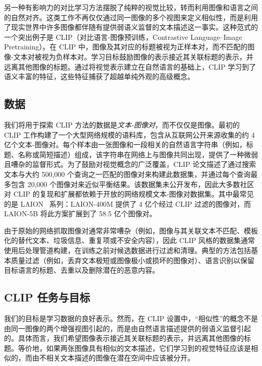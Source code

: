 \documentclass[../../book-main_zh.tex]{subfiles}
\begin{document}
另一种有影响力的对比学习方法摆脱了纯粹的视觉比较，转而利用图像和语言之间的自然对齐。这类工作不再仅仅通过同一图像的多个视图来定义相似性，而是利用了现实世界中许多图像都伴随有提供弱语义监督的文本描述这一事实。这种范式的一个突出例子是 CLIP（对比语言-图像预训练，Contrastive Language–Image Pretraining）\citep{Radford2021-ir}。在 CLIP 中，图像及其对应的标题被视为正样本对，而不匹配的图像-文本对被视为负样本对。学习目标鼓励图像的表示接近其关联标题的表示，并远离其他图像的标题。通过将视觉表示建立在自然语言的基础上，CLIP 学习到了语义丰富的特征，这些特征捕获了超越单纯外观的高级概念。

\subsection{数据}

我们将用于探索 CLIP 方法的数据是{\em 文本-图像对}，而不仅仅是图像。最初的 CLIP 工作构建了一个大型网络规模的语料库，包含从互联网公开来源收集的约 4 亿个文本-图像对。每个样本由一张图像和一段相关的自然语言字符串（例如，标题、名称或简短描述）组成，该字符串在网络上与图像共同出现，提供了一种微弱且嘈杂的监督形式。为了鼓励对视觉概念的广泛覆盖，CLIP 论文描述了通过搜索文本与大约 500{,}000 个查询之一匹配的图像对来构建此数据集，并通过每个查询最多包含 20{,}000 个图像对来近似平衡结果。该数据集未公开发布，因此大多数社区对 CLIP 的复现和扩展都依赖于开放的网络规模文本-图像对数据集。其中最常见的是 LAION~\citep{schuhmann2022laion5bopenlargescaledataset} 系列：LAION-400M 提供了 4 亿个经过 CLIP 过滤的图像对，而 LAION-5B 将此方案扩展到了 58.5 亿个图像对。

由于原始的网络抓取图像对通常非常嘈杂（例如，图像与其关联文本不匹配、模板化的替代文本、垃圾信息、重复项或不安全内容），因此 CLIP 风格的数据集通常使用后处理管道构建，在训练之前对候选数据进行过滤和清理。典型的方法包括基本质量过滤（例如，丢弃文本极短或图像极小或损坏的图像对）、语言识别以保留目标语言的标题、去重以及删除潜在的恶意内容。

\subsection{CLIP 任务与目标}
我们的目标是学习数据的良好表示。然而，在 CLIP 设置中，“相似性”的概念不是由同一图像的两个增强视图引起的，而是由自然语言描述提供的弱语义监督引起的。具体而言，我们希望图像表示接近其关联标题的表示，并远离其他图像的标题。等价地，如果两张图像具有相似的文本描述，它们学习到的视觉特征应该是相似的，而由不相关文本描述的图像在潜在空间中应该被分开。
\end{document}
